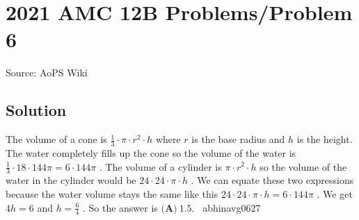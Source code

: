 \documentclass[12pt]{article}
\begin{document}
\section*{{2021 AMC 12B Problems/Problem 6}}
Source: AoPS Wiki

\subsection*{Solution}
The volume of a cone is $\frac{1}{3} \cdot\pi \cdot r^2 \cdot h$ where $r$ is the base radius and $h$ is the height. The water completely fills up the cone so the volume of the water is $\frac{1}{3}\cdot18\cdot144\pi = 6\cdot144\pi$ . The volume of a cylinder is $\pi \cdot r^2 \cdot h$ so the volume of the water in the cylinder would be $24\cdot24\cdot\pi\cdot h$ . We can equate these two expressions because the water volume stays the same like this $24\cdot24\cdot\pi\cdot h = 6\cdot144\pi$ . We get $4h = 6$ and $h=\frac{6}{4}$ . So the answer is $\boxed{\textbf{(A)} ~1.5}.$ ~abhinavg0627
\end{document}
